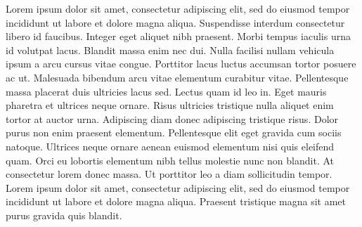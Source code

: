 \documentclass{cup-ino}
\begin{document}
Lorem ipsum dolor sit amet, consectetur adipiscing elit, sed do eiusmod tempor incididunt ut labore et dolore magna aliqua. Suspendisse interdum consectetur libero id faucibus. Integer eget aliquet nibh praesent. Morbi tempus iaculis urna id volutpat lacus. Blandit massa enim nec dui. Nulla facilisi nullam vehicula ipsum a arcu cursus vitae congue. Porttitor lacus luctus accumsan tortor posuere ac ut. Malesuada bibendum arcu vitae elementum curabitur vitae. Pellentesque massa placerat duis ultricies lacus sed. Lectus quam id leo in. Eget mauris pharetra et ultrices neque ornare. Risus ultricies tristique nulla aliquet enim tortor at auctor urna. Adipiscing diam donec adipiscing tristique risus. Dolor purus non enim praesent elementum. Pellentesque elit eget gravida cum sociis natoque. Ultrices neque ornare aenean euismod elementum nisi quis eleifend quam. Orci eu lobortis elementum nibh tellus molestie nunc non blandit. At consectetur lorem donec massa. Ut porttitor leo a diam sollicitudin tempor. Lorem ipsum dolor sit amet, consectetur adipiscing elit, sed do eiusmod tempor incididunt ut labore et dolore magna aliqua. Praesent tristique magna sit amet purus gravida quis blandit.
\end{document}
